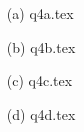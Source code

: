 \documentclass[12pt, a4paper,answers]{exam}
\begin{document}
\begin{questions}
\begin{solution}
	\begin{enumerate}
		\item[(a)] {q4a.tex}
		\item[(b)] {q4b.tex}
		\item[(c)] {q4c.tex}
		\item[(d)] {q4d.tex}
	\end{enumerate}
\end{solution}


\end{questions}
\end{document}
